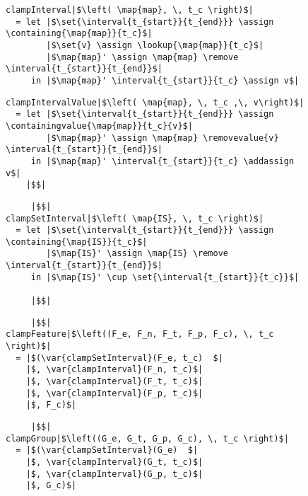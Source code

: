\begin{figure}
\begin{minipage}[t]{0.5\textwidth}
  \begin{verbatim}
clampInterval|$\left( \map{map}, \, t_c \right)$|
  = let |$\set{\interval{t_{start}}{t_{end}}} \assign \containing{\map{map}}{t_c}$|
        |$\set{v} \assign \lookup{\map{map}}{t_c}$|
        |$\map{map}' \assign \map{map} \remove \interval{t_{start}}{t_{end}}$|
     in |$\map{map}' \interval{t_{start}}{t_c} \assign v$|
  \end{verbatim}
\end{minipage}
\begin{minipage}[t]{0.5\textwidth}
  \begin{verbatim}
clampIntervalValue|$\left( \map{map}, \, t_c ,\, v\right)$|
  = let |$\set{\interval{t_{start}}{t_{end}}} \assign \containingvalue{\map{map}}{t_c}{v}$|
        |$\map{map}' \assign \map{map} \removevalue{v} \interval{t_{start}}{t_{end}}$|
     in |$\map{map}' \interval{t_{start}}{t_c} \addassign v$|
    |$$|
  \end{verbatim}
\end{minipage}

\begin{minipage}[t]{0.5\textwidth}
  \begin{verbatim}
     |$$|
clampSetInterval|$\left( \map{IS}, \, t_c \right)$|
  = let |$\set{\interval{t_{start}}{t_{end}}} \assign \containing{\map{IS}}{t_c}$|
        |$\map{IS}' \assign \map{IS} \remove \interval{t_{start}}{t_{end}}$|
     in |$\map{IS}' \cup \set{\interval{t_{start}}{t_c}}$|

     |$$|
  \end{verbatim}
\end{minipage}
\begin{minipage}[t]{0.5\textwidth}
  \begin{verbatim}
     |$$|
clampFeature|$\left((F_e, F_n, F_t, F_p, F_c), \, t_c \right)$|
  = |$(\var{clampSetInterval}(F_e, t_c)  $|
    |$, \var{clampInterval}(F_n, t_c)$|
    |$, \var{clampInterval}(F_t, t_c)$|
    |$, \var{clampInterval}(F_p, t_c)$|
    |$, F_c)$|
  \end{verbatim}
\end{minipage}

\begin{minipage}{0.5\textwidth}
  \begin{verbatim}
     |$$|
clampGroup|$\left((G_e, G_t, G_p, G_c), \, t_c \right)$|
  = |$(\var{clampSetInterval}(G_e)  $|
    |$, \var{clampInterval}(G_t, t_c)$|
    |$, \var{clampInterval}(G_p, t_c)$|
    |$, G_c)$|
  \end{verbatim}
\end{minipage}
\end{figure}

